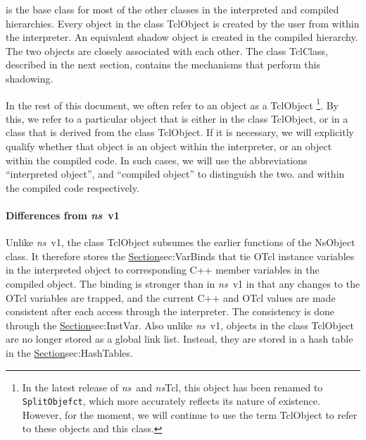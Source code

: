 is the base class for most of the other classes
in the interpreted and compiled hierarchies.
Every object in the class TclObject is created by the user
from within the interpreter.
An equivalent shadow object is created in the compiled hierarchy.
The two objects are closely associated with each other.
The class TclClass, described in the next section,
contains the mechanisms that perform this shadowing.

In the rest of this document, we often refer to an object as a TclObject%
\footnote{In the latest release of \emph{ns}\ and \emph{ns}Tcl,
  this object has been renamed to {\tt SplitObjefct},
  which more accurately reflects its nature of existence.
  However, for the moment,
  we will continue to use the term TclObject
  to refer to these objects and this class.}.
By this, we refer to a particular object that is either in the class
TclObject, or in a class that is derived from the class TclObject.
If it is necessary, we will explicitly qualify whether that object is
an object within the interpreter, or an object within the compiled code.
In such cases,
we will use the abbreviations ``interpreted object'', and
``compiled object'' to distinguish the two.
and within the compiled code respectively.

\paragraph{Differences from \emph{ns}~v1}
Unlike \emph{ns}~v1, the class TclObject
subsumes the earlier functions of the NsObject class.
It therefore stores the
\href{interface variable bindings}{Section}{sec:VarBinds}
that tie OTcl instance variables in the interpreted object
to corresponding C++ member variables in the compiled object.
The binding is stronger than in \emph{ns}~v1 in that
any changes to the OTcl variables are trapped,
and the current C++ and OTcl values
are made consistent after each access through the interpreter.
The consistency is done through the
\href{class InstVar}{Section}{sec:InstVar}.
Also unlike \emph{ns}~v1, objects in the class TclObject
are no longer stored as a global link list.
Instead, they are stored in a hash table in the
\href{class Tcl}{Section}{sec:HashTables}.

